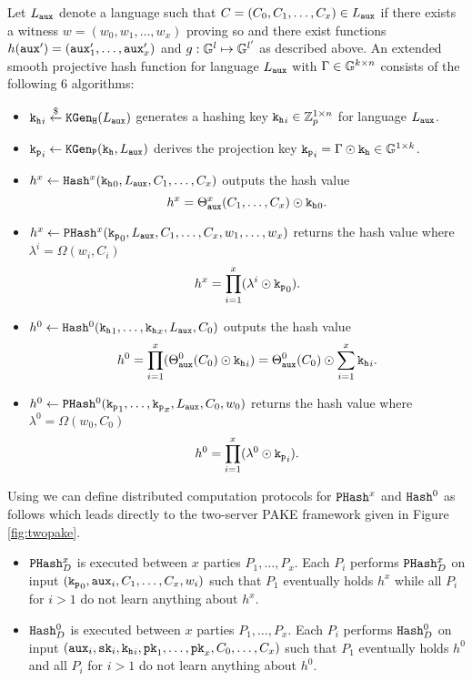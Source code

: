\begin{definition}[\SPHFF]\label{def:symgensphf}
Let $L_\mathtt{aux}$ denote a language such that $C=(C_0,C_1,\dots,C_x)\in L_\mathtt{aux}$ if there exists a witness $w=(w_0,w_1,\dots,w_x)$ proving so and there exist functions $h(\mathtt{aux}')=(\mathtt{aux}'_1,\dots,\mathtt{aux}'_x)$ and $g:\mathbb{G}^l\mapsto\mathbb{G}^{l'}$ as described above.
An extended smooth projective hash function for language $L_\mathtt{aux}$ with $\Gamma\in\mathbb{G}^{k\times n}$ consists of the following 6 algorithms:

\begin{itemize}
	\item $\mathtt{k_h}_i\stackrel{\$}{\gets}\mathtt{KGen_H}(L_\mathtt{aux})$ generates a hashing key $\mathtt{k_h}_i\in\mathbb{Z}_p^{1\times n}$ for language $L_\mathtt{aux}$.
	
	\item $\mathtt{k_p}_i\gets\mathtt{KGen_P}(\mathtt{k_h},L_\mathtt{aux})$ derives the projection key $\mathtt{k_p}_i=\Gamma \odot \mathtt{k_h}\in\mathbb{G}^{1\times k}$.
	
	\item $h^x\gets\mathtt{Hash}^x(\mathtt{k_h}_0,L_\mathtt{aux},C_1,\dots,C_x)$ outputs the hash value
	$$h^x=\Theta^x_{\mathtt{aux}}(C_1,\dots,C_x)\odot\mathtt{k_h}_0.$$
	
	\item $h^x\gets\mathtt{PHash}^x(\mathtt{k_p}_0,L_\mathtt{aux},C_1,\dots,C_x,w_1,\dots,w_x)$ returns the hash value where $\lambda^i=\Omega(w_i,C_i)$
	\[h^x=\prod^{x}_{i=1}(\lambda^i\odot \mathtt{k_p}_0).\] 
	
	\item $h^0\gets\mathtt{Hash}^0(\mathtt{k_h}_1,\dots,\mathtt{k_h}_x,L_\mathtt{aux},C_0)$ outputs the hash value 
	\[h^0=\prod^{x}_{i=1}(\Theta_{\mathtt{aux}}^0(C_0)\odot\mathtt{k_h}_i)=\Theta_{\mathtt{aux}}^0(C_0)\odot \sum^x_{i=1}\mathtt{k_h}_i.\]
	
	\item $h^0\gets\mathtt{PHash}^0(\mathtt{k_p}_1,\dots,\mathtt{k_p}_x,L_\mathtt{aux},C_0,w_0)$ returns the hash value where $\lambda^0=\Omega(w_0,C_0)$
	\[h^0=\prod^{x}_{i=1}(\lambda^0\odot \mathtt{k_p}_i).\]
\end{itemize}
\eod
\end{definition}

\noindent
Using \SPHFF we can define distributed computation protocols for $\mathtt{PHash}^x$ and $\mathtt{Hash}^0$ as follows which leads directly to the two-server \ac{PAKE} framework given in Figure \ref{fig:twopake}.
\begin{itemize}
\item $\mathtt{PHash}^x_D$ is executed between $x$ parties $P_1,\dots,P_x$.
	Each $P_i$ performs $\mathtt{PHash}^x_D$ on input $(\mathtt{k_p}_0,\mathtt{aux}_i,\allowbreak C_1,\dots,C_x,w_i)$ such that $P_1$ eventually holds $h^x$ while all $P_i$ for $i>1$ do not learn anything about $h^x$.
	
	\item $\mathtt{Hash}^0_D$ is executed between $x$ parties $P_1,\dots,P_x$.
	Each $P_i$ performs $\mathtt{Hash}^0_D$ on input $(\mathtt{aux}_i,\mathtt{sk}_i,\mathtt{k_h}_i,\allowbreak \mathtt{pk}_1,\dots,\mathtt{pk}_x,C_0,\dots,C_x)$ such that $P_1$ eventually holds $h^0$ and all $P_i$ for $i>1$ do not learn anything about $h^0$.
\end{itemize}

